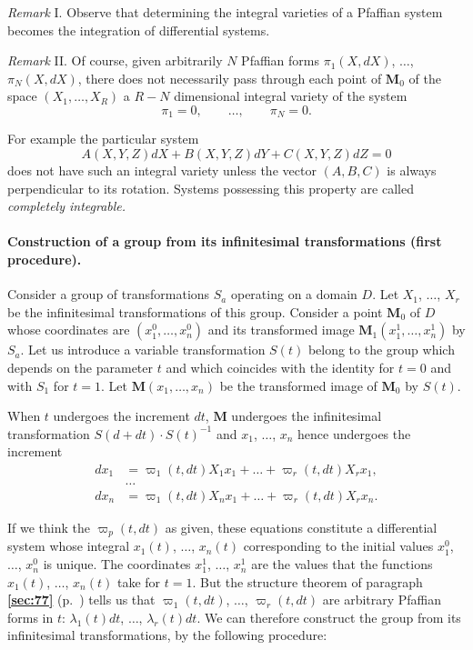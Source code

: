 \documentclass[leqno,11pt]{book}
\numberwithin{equation}{chapter}
\theoremstyle{shape1}
\theoremstyle{shapesmall}
\newcommand{\fsref}[1]{{\rm\textsection\textbf{\ref{sec:#1}}}}
\newcommand{\vp}{\varpi}
\newcommand{\somespace}{\vspace{9pt}}
\begin{document}
\somespace

\emph{Remark} I. Observe that determining the integral varieties of a Pfaffian system becomes the integration of differential systems.

\somespace

\emph{Remark} II. Of course, given arbitrarily $N$ Pfaffian forms $\pi_{1}(X,dX)$, $\dots$, $\pi_{N}(X,dX)$, there does not necessarily pass through each point of $\mathbf{M}_{0}$ of the space $(X_{1},\dots,X_{R})$ a $R-N$ dimensional integral variety of the system
\[
\pi_{1}=0,\qquad\dots,\qquad\pi_{N}=0.
\]

For example the particular system
\[
A(X,Y,Z)dX+B(X,Y,Z)dY+C(X,Y,Z)dZ=0
\]
does not have such an integral variety unless the vector $(A,B,C)$ is always perpendicular to its rotation. Systems possessing this property are called \emph{completely integrable.}

\paragraph{Construction of a group from its infinitesimal transformations (first procedure).}
\label{sec:85}
Consider a group of transformations $S_{a}$ operating on a domain $D$. Let $X_{1}$, $\dots$, $X_{r}$ be the infinitesimal transformations of this group. Consider a point $\mathbf{M}_{0}$ of $D$ whose coordinates are $(x_{1}^{0},\dots,x_{n}^{0})$ and its transformed image $\mathbf{M}_{1}(x^{1}_{1},\dots,x_{n}^{1})$ by $S_{a}$. Let us introduce a variable transformation $S(t)$ belong to the group which depends on  the parameter $t$ and which coincides with the identity for $t=0$ and with $S_{1}$ for $t=1$. Let $\mathbf{M}(x_{1},\dots,x_{n})$ be the transformed image of $\mathbf{M}_{0}$ by $S(t)$.

When $t$ undergoes the increment $dt$, $\mathbf{M}$ undergoes the infinitesimal transformation $S(d+dt)\cdot S(t)^{-1}$ and $x_{1}$, $\dots$, $x_{n}$ hence undergoes the increment
\begin{align*}
  dx_{1}&=\vp_{1}(t,dt)X_{1}x_{1}+\dots+\vp_{r}(t,dt)X_{r}x_{1},\\
  &\dots\\
  dx_{n}&=\vp_{1}(t,dt)X_{n}x_{1}+\dots+\vp_{r}(t,dt)X_{r}x_{n}.
\end{align*}

If we think the $\vp_{p}(t,dt)$ as given, these equations constitute a differential system whose integral $x_{1}(t)$, $\dots$, $x_{n}(t)$ corresponding to the initial values $x_{1}^{0}$, $\dots$, $x_{n}^{0}$ is unique. The coordinates $x_{1}^{1}$, $\dots$, $x_{n}^{1}$ are the values that the functions $x_{1}(t)$, $\dots$, $x_{n}(t)$ take for $t=1$. But the structure theorem of paragraph \fsref{77} (p.~\pageref{sec:77}) tells us that $\vp_{1}(t,dt)$, $\dots$, $\vp_{r}(t,dt)$ are arbitrary Pfaffian forms in $t$: $\lambda_{1}(t)dt$, $\dots$, $\lambda_{r}(t)dt$. We can therefore construct the group from its infinitesimal transformations, by the following procedure:
\end{document}
